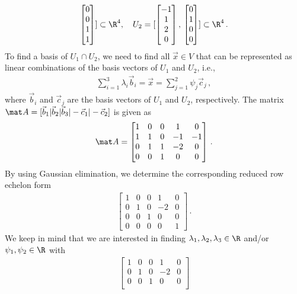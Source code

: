 \documentclass[12pt,twoside]{article}
\begin{document}
\begin{itemize}
\begin{align}
\begin{bmatrix}
0\\0\\1\\1
\end{bmatrix}
] \subset\R^4, \quad 
U_2 = [
\begin{bmatrix}
-1\\1\\2\\0
\end{bmatrix}
,\,
\begin{bmatrix}
0\\1\\0\\0
\end{bmatrix}
]\subset\R^4\,.
\end{align}
To find a basis of $U_1\cap U_2$, we need to find all $\vec x \in V$ that can be represented as linear combinations of the basis vectors of $U_1$ and $U_2$, i.e., 
\begin{align}
\sum_{i=1}^3 \lambda_i \vec b_i = \vec x = \sum_{j=1}^2 \psi_j \vec c_j\,,
\end{align}
where $\vec b_i$ and $\vec c_j$ are the basis vectors of $U_1$ and $U_2$, respectively.
%
The matrix $\mat A = [\vec b_1|\vec b_2|\vec b_3| -\vec c_1|-\vec
c_2]$ is given as
\begin{align}
\mat A = 
\begin{bmatrix}
1 & 0 & 0 & 1 & 0\\
1 & 1 & 0 & -1 & -1\\
0 & 1 & 1 & -2 & 0\\
0 & 0 & 1 & 0 & 0
\end{bmatrix}\,.
\end{align}
By using Gaussian elimination, we determine the corresponding reduced row echelon form 
\begin{align}
\begin{bmatrix}
1 & 0 & 0 & 1& 0\\
0 & 1 & 0 & -2 & 0\\
0 & 0 & 1 & 0 & 0\\
0 & 0 & 0 & 0 & 1
\end{bmatrix}
\,.
\end{align}
We keep in mind that we are interested in finding $\lambda_1,\lambda_2,\lambda_3\in\R$ and/or $\psi_1,\psi_2\in\R$ with 
\begin{align}
\begin{bmatrix}
1 & 0 & 0 & 1& 0\\
0 & 1 & 0 & -2 & 0\\
0 & 0 & 1 & 0 & 0\\

\end{bmatrix}
\end{align}
\end{itemize}
\end{document}
